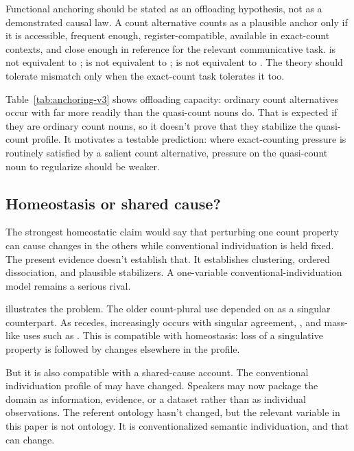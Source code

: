 \documentclass[12pt,a4paper]{article}
\begin{document}


Functional anchoring should be stated as an offloading hypothesis, not as a demonstrated causal law. A count alternative counts as a plausible anchor only if it is accessible, frequent enough, register-compatible, available in exact-count contexts, and close enough in reference for the relevant communicative task.  is not equivalent to ;  is not equivalent to ;  is not equivalent to . The theory should tolerate mismatch only when the exact-count task tolerates it too.

Table~\ref{tab:anchoring-v3} shows offloading capacity: ordinary count alternatives occur with  far more readily than the quasi-count nouns do. That is expected if they are ordinary count nouns, so it doesn't prove that they stabilize the quasi-count profile. It motivates a testable prediction: where exact-counting pressure is routinely satisfied by a salient count alternative, pressure on the quasi-count noun to regularize should be weaker.

\subsection{Homeostasis or shared cause?}\label{sec:homeostasis-v3}

The strongest homeostatic claim would say that perturbing one count property can cause changes in the others while conventional individuation is held fixed. The present evidence doesn't establish that. It establishes clustering, ordered dissociation, and plausible stabilizers. A one-variable conventional-individuation model remains a serious rival.

 illustrates the problem. The older count-plural use depended on  as a singular counterpart. As  recedes,  increasingly occurs with singular agreement, , and mass-like uses such as  \citep{garner2016}. This is compatible with homeostasis: loss of a singulative property is followed by changes elsewhere in the profile.

But it is also compatible with a shared-cause account. The conventional individuation profile of  may have changed. Speakers may now package the domain as information, evidence, or a dataset rather than as individual observations. The referent ontology hasn't changed, but the relevant variable in this paper is not ontology. It is conventionalized semantic individuation, and that can change.
\end{document}
